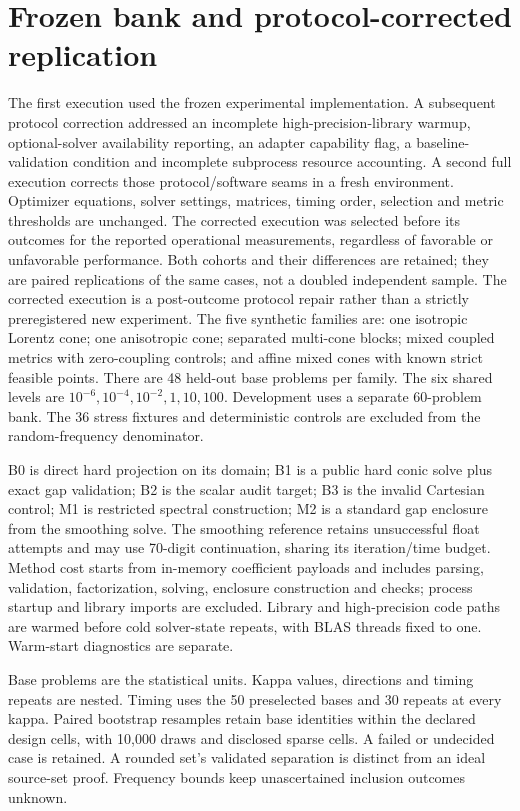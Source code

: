 \documentclass[10pt]{article}
\begin{document}
\section{Frozen bank and protocol-corrected replication}
The first execution used the frozen experimental implementation. A subsequent protocol correction addressed an incomplete high-precision-library warmup, optional-solver availability reporting, an adapter capability flag, a baseline-validation condition and incomplete subprocess resource accounting. A second full execution corrects those protocol/software seams in a fresh environment. Optimizer equations, solver settings, matrices, timing order, selection and metric thresholds are unchanged. The corrected execution was selected before its outcomes for the reported operational measurements, regardless of favorable or unfavorable performance. Both cohorts and their differences are retained; they are paired replications of the same cases, not a doubled independent sample. The corrected execution is a post-outcome protocol repair rather than a strictly preregistered new experiment.
The five synthetic families are: one isotropic Lorentz cone; one anisotropic cone; separated multi-cone blocks; mixed coupled metrics with zero-coupling controls; and affine mixed cones with known strict feasible points. There are 48 held-out base problems per family. The six shared levels are $10^{-6},10^{-4},10^{-2},1,10,100$. Development uses a separate 60-problem bank. The 36 stress fixtures and deterministic controls are excluded from the random-frequency denominator.

B0 is direct hard projection on its domain; B1 is a public hard conic solve plus exact gap validation; B2 is the scalar audit target; B3 is the invalid Cartesian control; M1 is restricted spectral construction; M2 is a standard gap enclosure from the smoothing solve. The smoothing reference retains unsuccessful float attempts and may use 70-digit continuation, sharing its iteration/time budget. Method cost starts from in-memory coefficient payloads and includes parsing, validation, factorization, solving, enclosure construction and checks; process startup and library imports are excluded. Library and high-precision code paths are warmed before cold solver-state repeats, with BLAS threads fixed to one. Warm-start diagnostics are separate.

Base problems are the statistical units. Kappa values, directions and timing repeats are nested. Timing uses the 50 preselected bases and 30 repeats at every kappa. Paired bootstrap resamples retain base identities within the declared design cells, with 10,000 draws and disclosed sparse cells. A failed or undecided case is retained. A rounded set's validated separation is distinct from an ideal source-set proof. Frequency bounds keep unascertained inclusion outcomes unknown.
\end{document}
